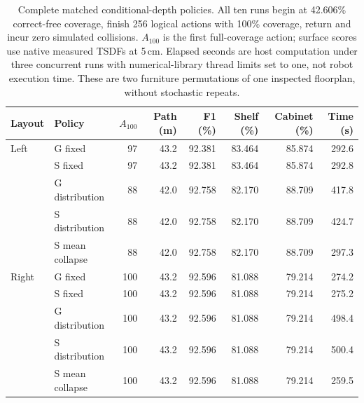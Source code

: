 \begin{table}[tbp]
\centering\small
\setlength{\tabcolsep}{3.5pt}
\caption{Complete matched conditional-depth policies. All ten runs begin at 42.606\% correct-free coverage, finish 256 logical actions with 100\% coverage, return and incur zero simulated collisions. $A_{100}$ is the first full-coverage action; surface scores use native measured TSDFs at 5\,cm. Elapsed seconds are host computation under three concurrent runs with numerical-library thread limits set to one, not robot execution time. These are two furniture permutations of one inspected floorplan, without stochastic repeats.}
\label{tab:joint-depth-policy}
\begin{tabular}{llrrrrrr}
\toprule
Layout & Policy & $A_{100}$ & Path (m) & F1 (\%) & Shelf (\%) & Cabinet (\%) & Time (s) \\
\midrule
Left & G fixed & 97 & 43.2 & 92.381 & 83.464 & 85.874 & 292.6 \\
 & S fixed & 97 & 43.2 & 92.381 & 83.464 & 85.874 & 292.8 \\
 & G distribution & 88 & 42.0 & 92.758 & 82.170 & 88.709 & 417.8 \\
 & S distribution & 88 & 42.0 & 92.758 & 82.170 & 88.709 & 424.7 \\
 & S mean collapse & 88 & 42.0 & 92.758 & 82.170 & 88.709 & 297.3 \\
\midrule
Right & G fixed & 100 & 43.2 & 92.596 & 81.088 & 79.214 & 274.2 \\
 & S fixed & 100 & 43.2 & 92.596 & 81.088 & 79.214 & 275.2 \\
 & G distribution & 100 & 43.2 & 92.596 & 81.088 & 79.214 & 498.4 \\
 & S distribution & 100 & 43.2 & 92.596 & 81.088 & 79.214 & 500.4 \\
 & S mean collapse & 100 & 43.2 & 92.596 & 81.088 & 79.214 & 259.5 \\
\bottomrule
\end{tabular}
\end{table}
